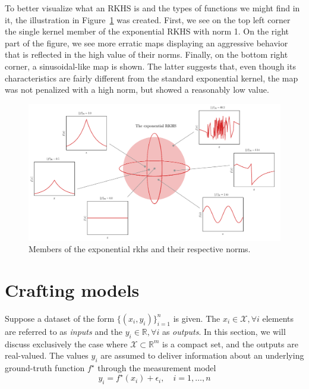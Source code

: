 To better visualize what an RKHS is and the types of functions we might find in it, the illustration in Figure~\ref{fig.rkhs_ex} was created. First, we see on the top left corner the single kernel member of the exponential RKHS with norm 1. On the right part of the figure, we see more erratic maps displaying an aggressive behavior that is reflected in the high value of their norms. Finally, on the bottom right corner, a sinusoidal-like map is shown. The latter suggests that, even though its characteristics are fairly different from the standard exponential kernel, the map was not penalized with a high norm, but showed a reasonably low value.

\begin{landscape}
\begin{figure}
	\includegraphics{../images/chap2_rkhs_ex.pdf} 
	\caption{Members of the exponential \ac{rkhs} and their respective norms.}
	\label{fig.rkhs_ex}
\end{figure}
\end{landscape}

\section{Crafting models}
\label{sec.crafting_models}

Suppose a dataset of the form $\{(x_i,y_i)\}_{i=1}^n$ is given. The $x_i \in \mathcal{X}, \forall i$ elements are referred to as \textit{inputs} and the $y_i \in \mathbb{R}, \forall i$ as \textit{outputs}. In this section, we will discuss exclusively the case where $\mathcal{X} \subset \mathbb{R}^m$ is a compact set, and the outputs are real-valued. The values $y_i$ are assumed to deliver information about an underlying ground-truth function $f^\star$ through the measurement model
\begin{equation}
	y_i = f^\star(x_i) + \epsilon_i, \quad i=1,\dots,n
\end{equation}

